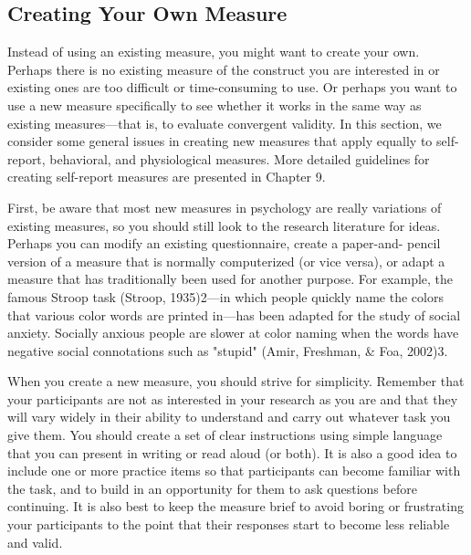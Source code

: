 \subsection{Creating Your Own Measure}

Instead of using an existing measure, you might want to create your own. Perhaps there is no existing measure of the construct you are interested in or existing ones are too difficult or time-consuming to use. Or perhaps you want to use a new measure specifically to see whether it works in the same way as existing measures—that is, to evaluate convergent validity. In this section, we consider some general issues in creating new measures that apply equally to self-report, behavioral, and physiological measures. More detailed guidelines for creating self-report measures are presented in Chapter 9.

First, be aware that most new measures in psychology are really variations of existing measures, so you should still look to the research literature for ideas. Perhaps you can modify an existing questionnaire, create a paper-and- pencil version of a measure that is normally computerized (or vice versa), or adapt a measure that has traditionally been used for another purpose. For example, the famous Stroop task (Stroop, 1935)2—in which people quickly name the colors that various color words are printed in—has been adapted for the study of social anxiety. Socially anxious people are slower at color naming when the words have negative social connotations such as "stupid" (Amir, Freshman, \& Foa, 2002)3.

When you create a new measure, you should strive for simplicity. Remember that your participants are not as interested in your research as you are and that they will vary widely in their ability to understand and carry out whatever task you give them. You should create a set of clear instructions using simple language that you can present in writing or read aloud (or both). It is also a good idea to include one or more practice items so that participants can become familiar with the task, and to build in an opportunity for them to ask questions before continuing. It is also best to keep the measure brief to avoid boring or frustrating your participants to the point that their responses start to become less reliable and valid.

